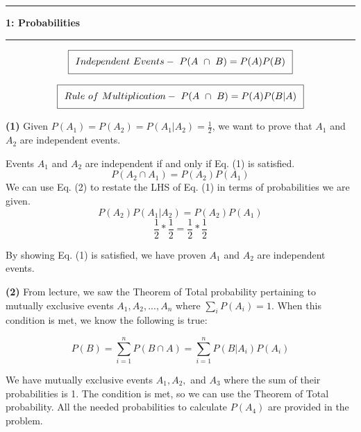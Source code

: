 \documentclass[11pt]{article}
\newcommand\question[2]{\vspace{.25in}\hrule\textbf{#1: #2}\vspace{.5em}\hrule\vspace{.10in}}
\renewcommand\part[1]{\vspace{.10in}\textbf{(#1)}}
\begin{document}
\raggedright
\newcommand\NAME{Jake Pitkin}  %
\newcommand\UID{u0891770}     %
\newcommand\HWNUM{6}              %

\question{1}{Probabilities}

\begin{equation}
\setlength\fboxsep{0.25cm}
\setlength\fboxrule{0.4pt}
\boxed{Independent \ Events- \ P(A \ \cap \ B) = P(A)P(B)}
\end{equation} 

\begin{equation}
\setlength\fboxsep{0.25cm}
\setlength\fboxrule{0.4pt}
\boxed{Rule \ of \ Multiplication- \ P(A \ \cap \ B) = P(A)P(B | A)}
\end{equation} 

\part{1} Given $P(A_1) = P(A_2) = P(A_1 | A_2) = \frac{1}{2}$, we want to prove that $A_1$ and $A_2$ are independent events.

Events $A_1$ and $A_2$ are independent if and only if Eq. (1) is satisfied.
$$P(A_2 \cap A_1) = P(A_2)P(A_1)$$
 We can use Eq. (2) to restate the LHS of Eq. (1) in terms of probabilities we are given.
$$P(A_2)P(A_1 | A_2) = P(A_2)P(A_1)$$
$$\frac{1}{2} * \frac{1}{2} = \frac{1}{2} * \frac{1}{2}$$

By showing Eq. (1) is satisfied, we have proven $A_1$ and $A_2$ are independent events.

\part{2} From lecture, we saw the Theorem of Total probability pertaining to mutually exclusive events $A_1, A_2, ... , A_n$ where $\sum_{i}P(A_i) = 1$. When this condition is met, we know the following is true:

$$P(B) = \sum_{i = 1}^n P(B \cap A) = \sum_{i = 1}^n P(B | A_i)P(A_i)$$

We have mutually exclusive events $A_1, A_2,$ and $A_3$ where the sum of their probabilities is 1. The condition is met, so we can use the Theorem of Total probability. All the needed probabilities to calculate $P(A_4)$ are provided in the problem.
\end{document}
